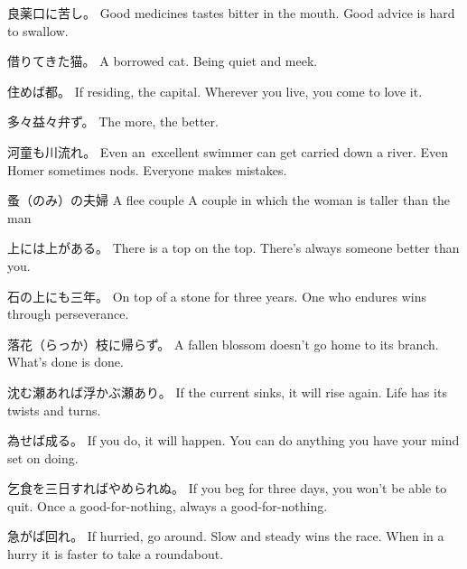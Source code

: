 \par{良薬口に苦し。 \hfill\break
Good medicines tastes bitter in the mouth. \hfill\break
Good advice is hard to swallow. }

\par{借りてきた猫。 \hfill\break
A borrowed cat. \hfill\break
Being quiet and meek. }

\par{住めば都。 \hfill\break
If residing, the capital. \hfill\break
Wherever you live, you come to love it. }

\par{多々益々弁ず。 \hfill\break
The more, the better. }

\par{河童も川流れ。 \hfill\break
Even an excellent swimmer can get carried down a river. \hfill\break
Even Homer sometimes nods. \hfill\break
Everyone makes mistakes. }

\par{蚤（のみ）の夫婦 \hfill\break
A flee couple \hfill\break
A couple in which the woman is taller than the man }

\par{上には上がある。 \hfill\break
There is a top on the top. \hfill\break
There's always someone better than you. }

\par{石の上にも三年。 \hfill\break
On top of a stone for three years. \hfill\break
One who endures wins through perseverance. }

\par{落花（らっか）枝に帰らず。 \hfill\break
A fallen blossom doesn't go home to its branch. \hfill\break
What's done is done. }

\par{沈む瀬あれば浮かぶ瀬あり。 \hfill\break
If the current sinks, it will rise again. \hfill\break
Life has its twists and turns. }

\par{為せば成る。 \hfill\break
If you do, it will happen. \hfill\break
You can do anything you have your mind set on doing. }

\par{乞食を三日すればやめられぬ。 \hfill\break
If you beg for three days, you won't be able to quit. \hfill\break
Once a good-for-nothing, always a good-for-nothing. }

\par{急がば回れ。 \hfill\break
If hurried, go around. \hfill\break
Slow and steady wins the race. \hfill\break
When in a hurry it is faster to take a roundabout. }

